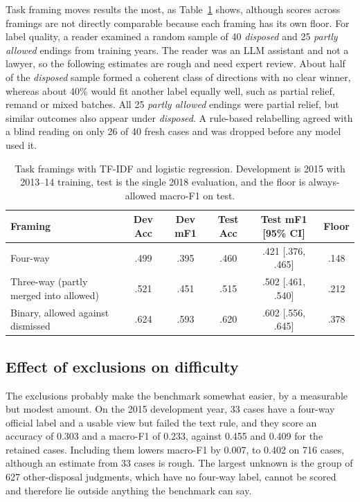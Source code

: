 \documentclass[journal]{IEEEtran}
\newcommand{\cls}[1]{\emph{#1}}
\begin{document}
Task framing moves results the most, as Table~\ref{tab:framing} shows, although scores across framings are not directly comparable because each framing has its own floor. For label quality, a reader examined a random sample of 40 \cls{disposed} and 25 \cls{partly allowed} endings from training years. The reader was an LLM assistant and not a lawyer, so the following estimates are rough and need expert review. About half of the \cls{disposed} sample formed a coherent class of directions with no clear winner, whereas about 40\% would fit another label equally well, such as partial relief, remand or mixed batches. All 25 \cls{partly allowed} endings were partial relief, but similar outcomes also appear under \cls{disposed}. A rule-based relabelling agreed with a blind reading on only 26 of 40 fresh cases and was dropped before any model used it.

\begin{table}[!t]\centering\footnotesize
\setlength{\tabcolsep}{4pt}
\caption{Task framings with TF-IDF and logistic regression. Development is 2015 with 2013--14 training, test is the single 2018 evaluation, and the floor is always-allowed macro-F1 on test.}\label{tab:framing}
\begin{tabular}{@{}lccccc@{}}\toprule
Framing & Dev Acc & Dev mF1 & Test Acc & Test mF1 [95\% CI] & Floor\\\midrule
Four-way & .499 & .395 & .460 & .421 [.376, .465] & .148\\
Three-way (partly merged into allowed) & .521 & .451 & .515 & .502 [.461, .540] & .212\\
Binary, allowed against dismissed & .624 & .593 & .620 & .602 [.556, .645] & .378\\\bottomrule
\end{tabular}\end{table}

\subsection{Effect of exclusions on difficulty}\label{sec:res-exclusions}
The exclusions probably make the benchmark somewhat easier, by a measurable but modest amount. On the 2015 development year, 33 cases have a four-way official label and a usable view but failed the text rule, and they score an accuracy of 0.303 and a macro-F1 of 0.233, against 0.455 and 0.409 for the retained cases. Including them lowers macro-F1 by 0.007, to 0.402 on 716 cases, although an estimate from 33 cases is rough. The largest unknown is the group of 627 other-disposal judgments, which have no four-way label, cannot be scored and therefore lie outside anything the benchmark can say.
\end{document}
